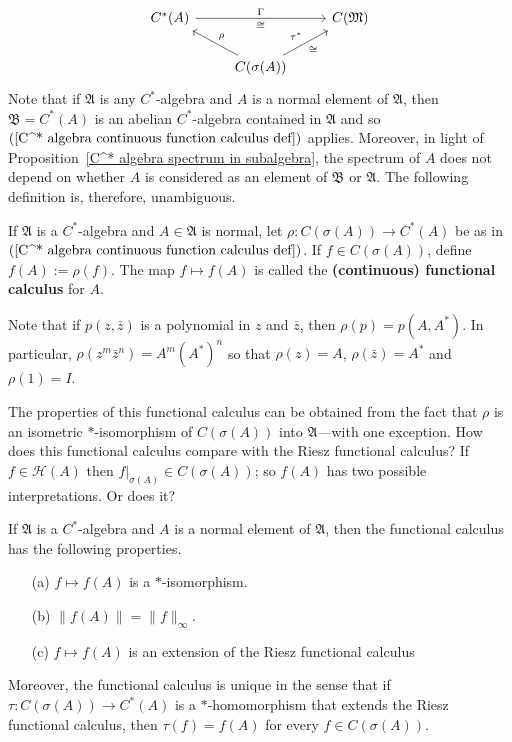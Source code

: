 \begin{equation}\label{C^* algebra continuous function calculus def}
\begin{tikzcd}
C^*(A)\ar[rr,"\Gamma","\cong"']&&C(\mathfrak{M})\\
&C(\sigma(A))\ar[ru,"\tau^*","\cong"']\ar[lu,swap,"\rho"]&
\end{tikzcd}
\end{equation}
Note that if $\mathfrak{A}$ is any $C^*$-algebra and $A$ is a normal element of $\mathfrak{A}$, then $\mathfrak{B}=C^*(A)$ is an abelian $C^*$-algebra contained in $\mathfrak{A}$ and so $(\ref{C^* algebra continuous function calculus def})$ applies. Moreover, in light of Proposition~\ref{C^* algebra spectrum in subalgebra}, the spectrum of $A$ does not depend on whether $A$ is considered as an element of $\mathfrak{B}$ or $\mathfrak{A}$. The following definition is, therefore, unambiguous.
\begin{definition}
If $\mathfrak{A}$ is a $C^*$-algebra and $A\in\mathfrak{A}$ is normal, let $\rho:C(\sigma(A))\to C^*(A)$ be as in $(\ref{C^* algebra continuous function calculus def})$. If $f\in C(\sigma(A))$, define $f(A):=\rho(f)$. The map $f\mapsto f(A)$ is called the \textbf{(continuous) functional calculus} for $A$.
\end{definition}
Note that if $p(z,\bar{z})$ is a polynomial in $z$ and $\bar{z}$, then $\rho(p)=p(A,A^*)$. In particular, $\rho(z^m\bar{z}^n)=A^m(A^*)^n$ so that $\rho(z)=A$, $\rho(\bar{z})=A^*$ and $\rho(1)=I$.\par
The properties of this functional calculus can be obtained from the fact that $\rho$ is an isometric $*$-isomorphism of $C(\sigma(A))$ into $\mathfrak{A}$---with one exception. How does this functional calculus compare with the Riesz functional calculus? If $f\in\mathcal{H}(A)$ then $f|_{\sigma(A)}\in C(\sigma(A))$; so $f(A)$ has two possible interpretations. Or does it?
\begin{proposition}\label{C^* algebra continuous function calculus prop}
If $\mathfrak{A}$ is a $C^*$-algebra and $A$ is a normal element of $\mathfrak{A}$, then the functional calculus has the following properties.
\begin{itemize}
\item[(a)] $f\mapsto f(A)$ is a $*$-isomorphism.
\item[(b)] $\|f(A)\|=\|f\|_\infty$.
\item[(c)] $f\mapsto f(A)$ is an extension of the Riesz functional calculus
\end{itemize}
Moreover, the functional calculus is unique in the sense that if $\tau:C(\sigma(A))\to C^*(A)$ is a $*$-homomorphism that extends the Riesz functional calculus, then $\tau(f)=f(A)$ for every $f\in C(\sigma(A))$.
\end{proposition}
